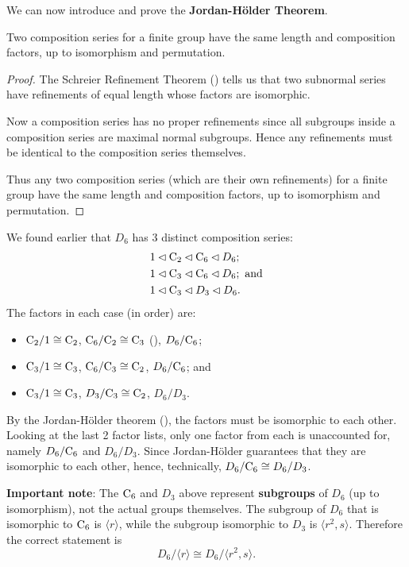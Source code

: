 We can now introduce and prove the \textbf{Jordan-H\"older Theorem}.
\begin{theorem}\label{thrm-jordan-holder}
    Two composition series for a finite group have the same length and composition factors, up to isomorphism and permutation.
\end{theorem}
\begin{proof}
    The Schreier Refinement Theorem () tells us that two subnormal series have refinements of equal length whose factors are isomorphic.
    
    Now a composition series has no proper refinements since all subgroups inside a composition series are maximal normal subgroups. Hence any refinements must be identical to the composition series themselves.
    
    Thus any two composition series (which are their own refinements) for a finite group have the same length and composition factors, up to isomorphism and permutation.
\end{proof}

\begin{example}
    We found earlier that $D_6$ has 3 distinct composition series:
    \begin{align*}
        &1 \lhd \mathrm{C}_{2} \lhd \mathrm{C}_{6} \lhd D_6;\\
        &1 \lhd \mathrm{C}_{3} \lhd \mathrm{C}_{6} \lhd D_6; \text{ and}\\
        &1 \lhd \mathrm{C}_{3} \lhd D_3 \lhd D_6.
    \end{align*}
    The factors in each case (in order) are:
    \begin{itemize}
        \item $\mathrm{C}_{2}/1 \cong \mathrm{C}_{2}$, $\mathrm{C}_{6}/\mathrm{C}_{2} \cong \mathrm{C}_{3}$ (), $D_6 / \mathrm{C}_{6}$;
        \item $\mathrm{C}_{3}/1 \cong \mathrm{C}_{3}$, $\mathrm{C}_{6}/\mathrm{C}_{3} \cong \mathrm{C}_{2}$, $D_6 / \mathrm{C}_{6}$; and
        \item $\mathrm{C}_{3}/1 \cong \mathrm{C}_{3}$, $D_3 / \mathrm{C}_{3} \cong \mathrm{C}_{2}$, $D_6 / D_3$.
    \end{itemize}
    By the Jordan-H\"older theorem (), the factors must be isomorphic to each other. Looking at the last 2 factor lists, only one factor from each is unaccounted for, namely $D_6 / \mathrm{C}_{6}$ and $D_6 / D_3$. Since Jordan-H\"older guarantees that they are isomorphic to each other, hence, technically, $D_6 / \mathrm{C}_{6} \cong D_6 / D_3$.

    \textbf{Important note}: The $\mathrm{C}_{6}$ and $D_3$ above represent \textbf{subgroups} of $D_6$ (up to isomorphism), not the actual groups themselves. The subgroup of $D_6$ that is isomorphic to $\mathrm{C}_{6}$ is $\langle r \rangle$, while the subgroup isomorphic to $D_3$ is $\langle r^2, s\rangle$. Therefore the correct statement is
    \[
        D_6 / \langle r \rangle \cong D_6 / \langle r^2, s\rangle.
    \]
\end{example}


